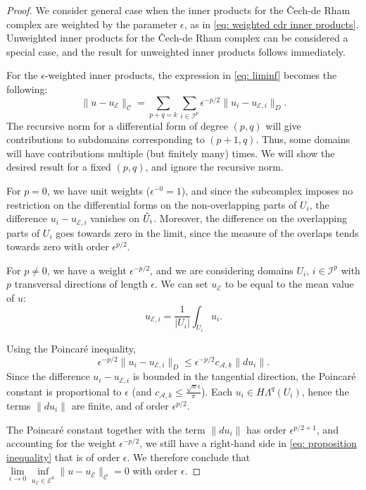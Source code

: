 \documentclass[reqno]{amsart}
\numberwithin{equation}{section}
\theoremstyle{definition}
\newcommand{\Ac}{\mathcal{A}}
\newcommand{\Cc}{\mathcal{C}}
\newcommand{\Ec}{\mathcal{E}}
\newcommand{\Ic}{\mathcal{I}}
\begin{document}
\begin{proof}
We consider general case when the inner products for the \v{C}ech-de Rham complex are weighted by the parameter $\epsilon$, as in \cref{eq: weighted cdr inner products}. Unweighted inner products for the \v{C}ech-de Rham complex can be considered a special case, and the result for unweighted inner products follows immediately. 

For the $\epsilon$-weighted inner products, the expression in \cref{eq: liminf} becomes the following:
\begin{equation}
 \|u - u_\Ec \|_\Cc = \sum_{p+q=k} \sum_{i \in \Ic^p} \epsilon^{-p/2} \|u_i - u_{\Ec,i}\|_D.
\end{equation}
The recursive norm for a differential form of degree $(p,q)$ will give contributions to subdomains corresponding to $(p+1,q)$. Thus, some domains will have contributions multiple (but finitely many) times. We will show the desired result for a fixed $(p,q)$, and ignore the recursive norm.

For $p=0$, we have unit weights ($\epsilon^{-0}=1$), and since the subcomplex imposes no restriction on the differential forms on the non-overlapping parts of $U_i$, the difference 
$u_i - u_{\Ec,i}$ vanishes on $\Tilde{U}_i$. Moreover, the difference on the overlapping parts of $U_i$ goes towards zero in the limit, since the measure of the overlaps tends towards zero with order $\epsilon^{p/2}$.

For $p \neq 0$, we have a weight $\epsilon^{-p/2}$, and we are considering domains $U_i$, $i \in \Ic^p$ with $p$ transversal directions of length $\epsilon$. We can set $u_\Ec$ to be equal to the mean value of $u$:
\begin{equation}
u_{\Ec,i}= \frac{1}{|U_i|}\int_{U_i} u_i.
\end{equation}

Using the Poincaré inequality,
\begin{equation}\label{eq: proposition inequality}
\epsilon^{-p/2} \|u_i - u_{\Ec,i}\|_D \leq \epsilon^{-p/2} c_{\Ac,k} \|du_i\|.
\end{equation}
Since the difference $u_i - u_{\Ec,i}$ is bounded in the tangential direction, the Poincaré constant is proportional to $\epsilon$ (and $c_{\Ac,k} \leq \frac{\sqrt{n}\epsilon}{\pi}$). Each $u_i \in H\Lambda^q(U_i)$, hence the terms $\|du_i\|$ are finite, and of order $\epsilon^{p/2}$.

The Poincaré constant together with the term $\|du_i\|$ has order $\epsilon^{p/2+1}$, and accounting for the weight $\epsilon^{-p/2}$, we still have a right-hand side in \cref{eq: proposition inequality} that is of order $\epsilon$. We therefore conclude that 
$\lim\limits_{\epsilon \to 0} \inf\limits_{u_\Ec \in \Ec^k} \|u - u_\Ec \|_\Cc = 0$ with order $\epsilon$.
\end{proof}
\end{document}
